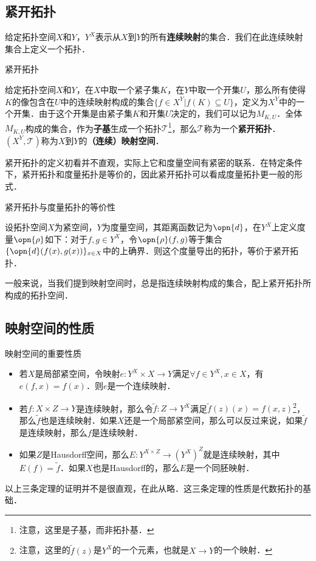 
\subsection{紧开拓扑}

给定拓扑空间$X$和$Y$，$Y^X$表示从$X$到$Y$的所有\textbf{连续映射}的集合．我们在此连续映射集合上定义一个拓扑．

\begin{definition}{紧开拓扑}

给定拓扑空间$X$和$Y$，在$X$中取一个紧子集$K$，在$Y$中取一个开集$U$，那么所有使得$K$的像包含在$U$中的连续映射构成的集合$\{f\in X^Y|f(K)\subseteq U\}$，定义为$X^Y$中的一个开集．由于这个开集是由紧子集$K$和开集$U$决定的，我们可以记为$M_{K, U}$．全体$M_{K, U}$构成的集合，作为\textbf{子基}生成一个拓扑$\mathcal{T}$\footnote{注意，这里是子基，而非拓扑基．}，那么$\mathcal{T}$称为一个\textbf{紧开拓扑}．$(X^Y, \mathcal{T})$称为$X$到$Y$的\textbf{（连续）映射空间}．

\end{definition}

紧开拓扑的定义初看并不直观，实际上它和度量空间有紧密的联系．在特定条件下，紧开拓扑和度量拓扑是等价的，因此紧开拓扑可以看成度量拓扑更一般的形式．

\begin{theorem}{紧开拓扑与度量拓扑的等价性}

设拓扑空间$X$为紧空间，$Y$为度量空间，其距离函数记为$\opn{d}$，在$Y^X$上定义度量$\opn{\rho}$如下：对于$f, g\in Y^X$，令$\opn{\rho}(f, g)$等于集合$\{\opn{d}(f(x), g(x))\}_{x\in X}$中的上确界．则这个度量导出的拓扑，等价于紧开拓扑．

\end{theorem}

一般来说，当我们提到映射空间时，总是指连续映射构成的集合，配上紧开拓扑所构成的拓扑空间．

\subsection{映射空间的性质}

\begin{theorem}{映射空间的重要性质}
\begin{itemize}
\item 若$X$是局部紧空间，令映射$e:Y^X\times X\rightarrow Y$满足$\forall f\in Y^X, x\in X$，有$e(f, x)=f(x)$．则$e$是一个连续映射．
\item 若$f:X\times Z\rightarrow Y$是连续映射，那么令$\tilde{f}:Z\rightarrow Y^X$满足$\tilde{f}(z)(x)=f(x, z)$\footnote{注意，这里的$\tilde{f}(z)$是$Y^X$的一个元素，也就是$X\rightarrow Y$的一个映射．}，那么$\tilde{f}$也是连续映射．如果$X$还是一个局部紧空间，那么可以反过来说，如果$\tilde{f}$是连续映射，那么$f$是连续映射．
\item 如果$Z$是Hausdorff空间，那么$E:Y^{X\times Z}\rightarrow(Y^X)^Z$就是连续映射，其中$E(f)=\tilde{f}$．如果$X$也是Hausdorff的，那么$E$是一个同胚映射．

\end{itemize}
\end{theorem}

以上三条定理的证明并不是很直观，在此从略．这三条定理的性质是代数拓扑的基础．
